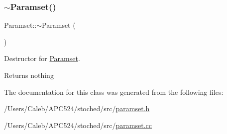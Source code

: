 \subsubsection{\texorpdfstring{$\sim$\+Paramset()}{~Paramset()}}
{\footnotesize\ttfamily Paramset\+::$\sim$\+Paramset (\begin{DoxyParamCaption}{ }\end{DoxyParamCaption})}



Destructor for \hyperlink{class_paramset}{Paramset}. 

\begin{DoxyReturn}{Returns}
nothing 
\end{DoxyReturn}


The documentation for this class was generated from the following files\+:\begin{DoxyCompactItemize}
\item 
/\+Users/\+Caleb/\+A\+P\+C524/stoched/src/\hyperlink{paramset_8h}{paramset.\+h}\item 
/\+Users/\+Caleb/\+A\+P\+C524/stoched/src/\hyperlink{paramset_8cc}{paramset.\+cc}\end{DoxyCompactItemize}
